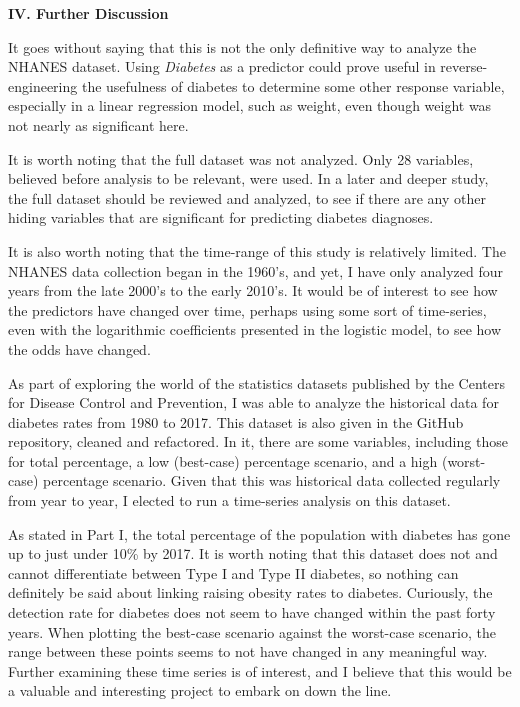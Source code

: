 \documentclass[letter,12pt]{article}
\begin{document}
	\begin{center}
		\textbf{IV. Further Discussion}\par
	\end{center}
	\justify
	It goes without saying that this is not the only definitive way to analyze the NHANES dataset. Using \textit{Diabetes} as a predictor could prove useful in reverse-engineering the usefulness of diabetes to determine some other response variable, especially in a linear regression model, such as weight, even though weight was not nearly as significant here.\par
	It is worth noting that the full dataset was not analyzed. Only 28 variables, believed before analysis to be relevant, were used. In a later and deeper study, the full dataset should be reviewed and analyzed, to see if there are any other hiding variables that are significant for predicting diabetes diagnoses.\par
	It is also worth noting that the time-range of this study is relatively limited. The NHANES data collection began in the 1960's, and yet, I have only analyzed four years from the late 2000's to the early 2010's. It would be of interest to see how the predictors have changed over time, perhaps using some sort of time-series, even with the logarithmic coefficients presented in the logistic model, to see how the odds have changed.\par
	As part of exploring the world of the statistics datasets published by the Centers for Disease Control and Prevention, I was able to analyze the historical data for diabetes rates from 1980 to 2017. This dataset is also given in the GitHub repository, cleaned and refactored. In it, there are some variables, including those for total percentage, a low (best-case) percentage scenario, and a high (worst-case) percentage scenario. Given that this was historical data collected regularly from year to year, I elected to run a time-series analysis on this dataset.\par
	As stated in Part I, the total percentage of the population with diabetes has gone up to just under 10\% by 2017. It is worth noting that this dataset does not and cannot differentiate between Type I and Type II diabetes, so nothing can definitely be said about linking raising obesity rates to diabetes. Curiously, the detection rate for diabetes does not seem to have changed within the past forty years. When plotting the best-case scenario against the worst-case scenario, the range between these points seems to not have changed in any meaningful way. Further examining these time series is of interest, and I believe that this would be a valuable and interesting project to embark on down the line.\par
	
\end{document}
